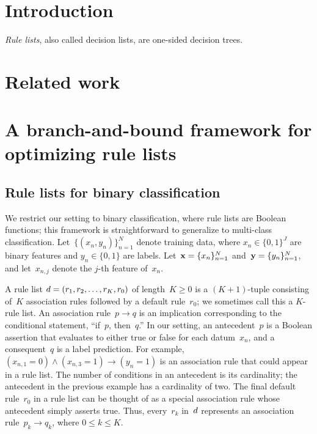 \section{Introduction}

\emph{Rule lists}, also called decision lists, are one-sided decision trees.

\section{Related work}

\citep{rivest:1987}

\citep{LethamRuMcMa15}

\citep{YangRuSe16}

\citep{garofalakis:2000-kdd,garofalakis:2000-sigkdd,garofalakis:2003}

\section{A branch-and-bound framework for optimizing rule lists}

\subsection{Rule lists for binary classification}
\label{sec:setup}

We restrict our setting to binary classification,
where rule lists are Boolean functions;
this framework is straightforward to generalize to multi-class classification.
%
Let~${\{(x_n, y_n)\}_{n=1}^N}$ denote training data,
where ${x_n \in \{0, 1\}^J}$ are binary features and ${y_n \in \{0, 1\}}$ are labels.
%
Let~${\mathbf{x} = \{x_n\}_{n=1}^N}$ and~${\mathbf{y} = \{y_n\}_{n=1}^N}$,
and let~${x_{n,j}}$ denote the $j$-th feature of~$x_n$.

A rule list ${{d} = (r_1, r_2, \dots, r_K, r_0)}$ of length~${K \ge 0}$ is a
${(K+1)}$-tuple consisting of~$K$ association rules followed by a default rule~$r_0$;
we sometimes call this a $K$-rule list.
%
An association rule~${p \rightarrow q}$ is an implication corresponding to the
conditional statement, ``if~$p$, then~$q$.''
%
In our setting, an antecedent~$p$ is a Boolean assertion that evaluates to either
true or false for each datum~$x_n$, and a consequent~$q$ is a label prediction.
%
For example,~${(x_{n, 1} = 0) \wedge (x_{n, 3} = 1) \rightarrow (y_n = 1)}$
is an association rule that could appear in a rule list.
%
The number of conditions in an antecedent is its cardinality;
the antecedent in the previous example has a cardinality of two.
%
The final default rule~$r_0$ in a rule list can be thought of as a special
association rule whose antecedent simply asserts true.
%
Thus, every~$r_k$ in~${d}$ represents an association rule~${p_k \rightarrow q_k}$,
where ${0 \le k\le K}$.

